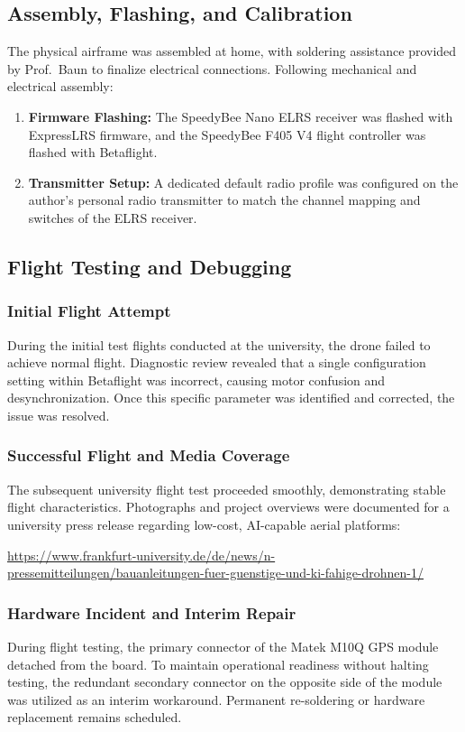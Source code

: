 \documentclass[11pt,a4paper]{article}
\begin{document}
\subsection{Assembly, Flashing, and Calibration} 
The physical airframe was assembled at home, with soldering assistance provided by Prof.~Baun to finalize electrical connections. Following mechanical and electrical assembly: 
\begin{enumerate}
    \item \textbf{Firmware Flashing:} The SpeedyBee Nano ELRS receiver was flashed with ExpressLRS firmware, and the SpeedyBee F405 V4 flight controller was flashed with Betaflight.
    \item \textbf{Transmitter Setup:} A dedicated default radio profile was configured on the author's personal radio transmitter to match the channel mapping and switches of the ELRS receiver.
\end{enumerate}

\subsection{Flight Testing and Debugging} 
\subsubsection{Initial Flight Attempt} 
During the initial test flights conducted at the university, the drone failed to achieve normal flight. Diagnostic review revealed that a single configuration setting within Betaflight was incorrect, causing motor confusion and desynchronization. Once this specific parameter was identified and corrected, the issue was resolved.

\subsubsection{Successful Flight and Media Coverage} 
The subsequent university flight test proceeded smoothly, demonstrating stable flight characteristics. Photographs and project overviews were documented for a university press release regarding low-cost, AI-capable aerial platforms: 
\begin{center}
\url{https://www.frankfurt-university.de/de/news/n-pressemitteilungen/bauanleitungen-fuer-guenstige-und-ki-fahige-drohnen-1/} 
\end{center}

\subsubsection{Hardware Incident and Interim Repair} 
During flight testing, the primary connector of the Matek M10Q GPS module detached from the board. To maintain operational readiness without halting testing, the redundant secondary connector on the opposite side of the module was utilized as an interim workaround. Permanent re-soldering or hardware replacement remains scheduled.
\end{document}
